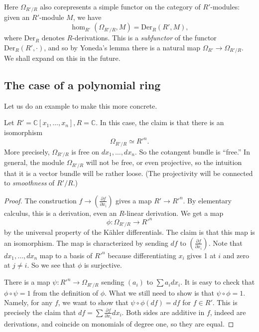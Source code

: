 Here $\Omega_{R'/R}$ also corepresents a simple functor on the category of
$R'$-modules: given an $R'$-module $M$, we have
\[ \hom_{R'}(\Omega_{R'/R}, M) = \mathrm{Der}_R(R', M),  \]
where $\mathrm{Der}_R$ denotes $R$-derivations.
This is a \emph{subfunctor} of the functor $\mathrm{Der}_R(R', \cdot)$, and so
by Yoneda's lemma there is a natural map $\Omega_{R'} \to \Omega_{R'/R}$.
We shall expand on this in the future.

\subsection{The case of a polynomial ring}
Let us do an example to make this more concrete.

\begin{example} \label{polynomialringdiff}
Let $R' = \mathbb{C}[x_1, \dots, x_n], R = \mathbb{C}$. In this case, the claim
is that there is an isomorphism
\[ \Omega_{R'/R} \simeq R'^n.  \]
More precisely, $\Omega_{R'/R}$ is free on $dx_1, \dots,dx_n$. So the cotangent
bundle is ``free.'' In general, the module $\Omega_{R'/R}$ will not be free, or
even projective, so the intuition that it is a vector bundle will be rather
loose. (The projectivity will be connected to \emph{smoothness} of $R'/R$.)

\begin{proof} 
The construction $f \to \left( \frac{\partial f}{\partial x_i}  \right)$ gives
a map $R' \to R'^n$. By elementary calculus, this is a derivation, even an
$R$-linear derivation.  We get a map
\[ \phi:\Omega_{R'/R} \to R'^n  \]
by the universal property of the K\"ahler differentials. The claim is that this
map is an isomorphism. The map is characterized by sending $df$ to $\left(
\frac{\partial f}{\partial x_i}\right)$. Note that $dx_1, \dots, dx_n$ map to a
basis of $R'^n$ because differentiating $x_i$ gives 1 at $i$ and zero at $j
\neq i$. So we see that $\phi$ is surjective. 

There is a map $\psi: R'^n \to \Omega_{R'/R}$ sending $\left(a_i  \right)$ to
$\sum a_i dx_i$. It is easy to check that $\phi \circ \psi = 1$ from the
definition of $\phi$. What we still need to show is that $\psi \circ \phi =1$.
Namely, for any $f$, we want to show that $\psi \circ \phi(df) = df$ for $f \in
R'$. This is precisely the claim that $df = \sum \frac{\partial f}{\partial
x_i} dx_i$. Both sides are additive in $f$, indeed are derivations, and
coincide on monomials of degree one, so they are equal.
\end{proof} 

\end{example} 

